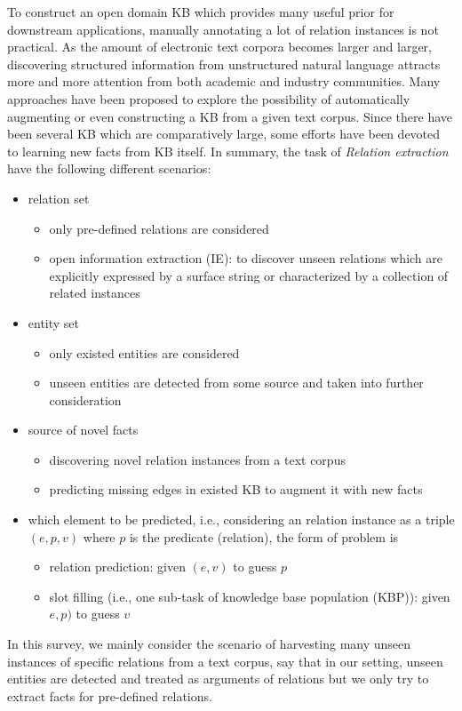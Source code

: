 \documentclass[10pt]{article} %
\theoremstyle{definition}
\theoremstyle{definition}
\begin{document}
To construct an open domain KB which provides many useful prior for downstream applications, manually annotating a lot of relation instances is not practical. 
As the amount of electronic text corpora becomes larger and larger, discovering structured information from unstructured natural language attracts more and more attention from both academic and industry communities.
Many approaches have been proposed to explore the possibility of automatically augmenting or even constructing a KB from a given text corpus. 
Since there have been several KB which are comparatively large, some efforts have been devoted to learning new facts from KB itself. 
In summary, the task of \emph{Relation extraction} have the following different scenarios:
\begin{itemize}
\item relation set  
	\begin{itemize}
	\item only pre-defined relations are considered 
	\item open information extraction (IE): to discover unseen relations which are explicitly expressed by a surface string or characterized by a collection of related instances 
	\end{itemize}
\item entity set  
	\begin{itemize}
	\item only existed entities are considered 
	\item unseen entities are detected from some source and taken into further consideration 
	\end{itemize}
\item source of novel facts 
	\begin{itemize}
	\item discovering novel relation instances from a text corpus 
	\item predicting missing edges in existed KB to augment it with new facts 
	\end{itemize}
\item which element to be predicted, i.e., considering an relation instance as a triple $(e,p,v)$ where $p$ is the predicate (relation), the form of problem is 
	\begin{itemize}
	\item relation prediction: given $(e, v)$ to guess $p$
	\item slot filling (i.e., one sub-task of knowledge base population (KBP)): given $e, p)$ to guess $v$
	\end{itemize}
\end{itemize}
In this survey, we mainly consider the scenario of harvesting many unseen instances of specific relations from a text corpus, 
say that in our setting, unseen entities are detected and treated as arguments of relations but we only try to extract facts for pre-defined relations. 
\end{document}
